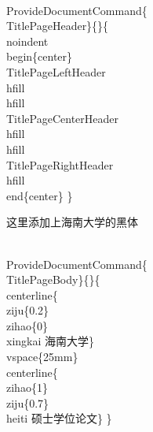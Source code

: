 \documentclass{hnuthesis}%
\begin{document}
\begin{nowebtrunk}
\\ProvideDocumentCommand\{\\TitlePageHeader\}\{\}\{
\\noindent
\\begin\{center\}
\\TitlePageLeftHeader 
\\hfill\\hfill \\TitlePageCenterHeader 
\\hfill\\hfill \\TitlePageRightHeader
\\hfill
\\end\{center\}
\}
\nwendcode{}\end{nowebtrunk}

\TitlePageHeader

这里添加上海南大学的黑体

\begin{nowebtrunk}
\nwenddocs{}\plusendmoddef\nwstartdeflinemarkup{}\nwenddeflinemarkup
\\ProvideDocumentCommand\{\\TitlePageBody\}\{\}\{
    \\centerline\{\\ziju\{0.2\}\\zihao\{0\} \\xingkai 海南大学\}
\\vspace\{25mm\}
    \\centerline\{\\zihao\{1\}\\ziju\{0.7\}\\heiti 硕士学位论文\}
\}
\nwendcode{}\end{nowebtrunk}

\TitlePageBody
\end{document}
